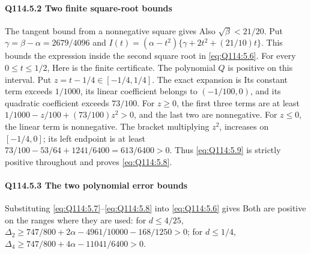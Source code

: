 \paragraph{Q114.5.2 Two finite square-root bounds}\label{part:Q114.5.2}
The tangent bound from a nonnegative square gives
Also $\sqrt\beta<\allowbreak 21/20$. Put $\gamma=\allowbreak \beta-\alpha=\allowbreak 2679/4096$ and
$I(t)=\allowbreak (\alpha-t^2)\{\gamma+2t^2+(21/10)t\}$.
This bounds the expression inside the second square root in
\eqref{eq:Q114:5.6}. For every $0\le\allowbreak  t\le\allowbreak 1/2$,
Here is the finite certificate. The polynomial $Q$ is positive on this
interval. Put $z=\allowbreak t-1/4\in[-1/4,\allowbreak 1/4]$. The exact expansion is
Its constant term exceeds $1/1000$, its linear coefficient belongs to
$(-1/100,\allowbreak 0)$, and its quadratic coefficient exceeds $73/100$.
For $z\ge\allowbreak 0$, the first three terms are at least
$1/1000-z/100+(73/100)z^2>\allowbreak 0$, and the last two are nonnegative.
For $z\le\allowbreak 0$, the linear term is nonnegative. The bracket multiplying $z^2$,
increases on $[-1/4,\allowbreak 0]$; its left endpoint is at least
$73/100-53/64+1241/6400=\allowbreak 613/6400>\allowbreak 0$.
Thus \eqref{eq:Q114:5.9} is strictly positive throughout and proves
\eqref{eq:Q114:5.8}.

\paragraph{Q114.5.3 The two polynomial error bounds}\label{part:Q114.5.3}
Substituting \eqref{eq:Q114:5.7}--\eqref{eq:Q114:5.8} into
\eqref{eq:Q114:5.6} gives
Both are positive on the ranges where they are used:
for $d\le\allowbreak 4/25$,
$\Delta_2\ge\allowbreak 747/800+2\alpha-4961/10000-168/1250>\allowbreak 0$;
for $d\le\allowbreak 1/4$,
$\Delta_4\ge\allowbreak 747/800+4\alpha-11041/6400>\allowbreak 0$.

